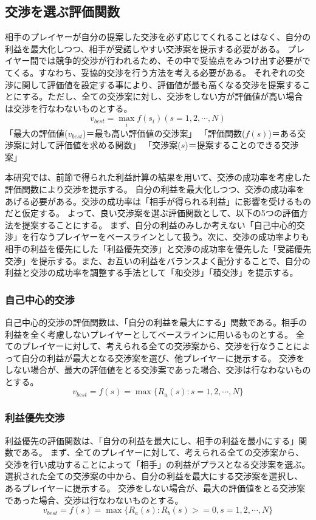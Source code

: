 \documentclass[a4, 10pt,dvipdfmx]{jsarticle}
\begin{document}
\subsection{交渉を選ぶ評価関数}
相手のプレイヤーが自分の提案した交渉を必ず応じてくれることはなく、自分の利益を最大化しつつ、相手が受諾しやすい交渉案を提示する必要がある。
プレイヤー間では競争的交渉が行われるため、その中で妥協点をみつけ出す必要がでてくる。すなわち、妥協的交渉を行う方法を考える必要がある。
それぞれの交渉に関して評価値を設定する事により、評価値が最も高くなる交渉を提案することにする。ただし、全ての交渉案に対し、交渉をしない方が評価値が高い場合は交渉を行なわないものとする。  
\begin{equation}
  v_{best} =  \max_{i}f(s_{i}) ( s = 1, 2, \cdots, N )
\end{equation}
「最大の評価値($v_{best}$)＝最も高い評価値の交渉案」
「評価関数($f(s)$)＝ある交渉案に対して評価値を求める関数」
「交渉案($s$)＝提案することのできる交渉案」

本研究では、前節で得られた利益計算の結果を用いて、交渉の成功率を考慮した評価関数により交渉を提示する。
自分の利益を最大化しつつ、交渉の成功率をあげる必要がある。交渉の成功率は「相手が得られる利益」に影響を受けるものだと仮定する。
よって、良い交渉案を選ぶ評価関数として、以下の5つの評価方法を提案することにする。
まず、自分の利益のみしか考えない「自己中心的交渉」を行なうプレイヤーをベースラインとして扱う。次に、交渉の成功率よりも相手の利益を優先にした「利益優先交渉」と交渉の成功率を優先した「受諾優先交渉」を提示する。また、お互いの利益をバランスよく配分することで、自分の利益と交渉の成功率を調整する手法として「和交渉」「積交渉」を提示する。

\subsubsection*{自己中心的交渉}
自己中心的交渉の評価関数は、「自分の利益を最大にする」関数である。相手の利益を全く考慮しないプレイヤーとしてベースラインに用いるものとする。
全てのプレイヤーに対して、考えられる全ての交渉案から、交渉を行なうことによって自分の利益が最大となる交渉案を選び、他プレイヤーに提示する。
交渉をしない場合が、最大の評価値をとる交渉案であった場合、交渉は行なわないものとする。
\begin{equation}
  v_{best} = f(s) = \max \{ R_{a}(s) : s = 1, 2, \cdots, N \}
\end{equation}

\subsubsection*{利益優先交渉} 
利益優先の評価関数は、「自分の利益を最大にし、相手の利益を最小にする」関数である。
まず、全てのプレイヤーに対して、考えられる全ての交渉案から、交渉を行い成功することによって「相手」の利益がプラスとなる交渉案を選ぶ。
選択された全ての交渉案の中から、自分の利益を最大にする交渉案を選択し、あるプレイヤーに提示する。
交渉をしない場合が、最大の評価値をとる交渉案であった場合、交渉は行なわないものとする。
\begin{equation}
  v_{best} = f(s) = \max \{ R_{a}(s) : R_{b}(s) >= 0, s = 1, 2, \cdots, N \}
\end{equation}
\end{document}
